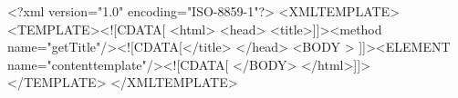 <?xml version="1.0" encoding="ISO-8859-1"?> <XMLTEMPLATE>
    <TEMPLATE><![CDATA[
        <html>
            <head>
                <title>]]><method name="getTitle"/><![CDATA[</title>
            </head>
                <BODY >
                    ]]><ELEMENT name="contenttemplate"/><![CDATA[
                </BODY>
        </html>]]>
    </TEMPLATE>
</XMLTEMPLATE>
